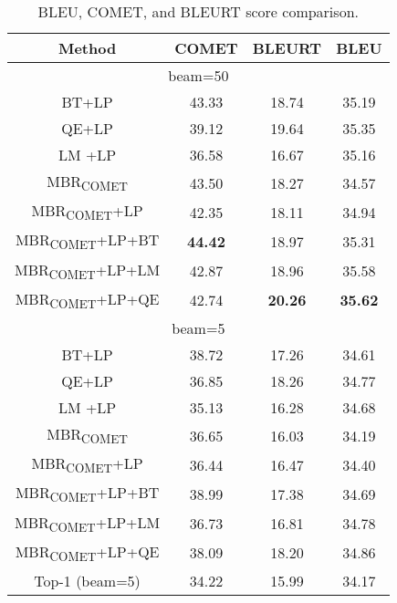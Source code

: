 \documentclass{article}
\begin{document}
\begin{table}[!htbp]
\centering
\begin{tabular}{cccc}
\toprule
Method         & COMET & BLEURT & BLEU  \\ \hline
\multicolumn{4}{c}{beam=50}                \\ \hline
BT+LP          & 43.33 & 18.74  & 35.19 \\
QE+LP          & 39.12 & 19.64  & 35.35 \\
LM +LP         & 36.58 & 16.67  & 35.16 \\
MBR\textsubscript{COMET}          & 43.50 & 18.27  & 34.57 \\
MBR\textsubscript{COMET}+LP       & 42.35 & 18.11  & 34.94 \\
MBR\textsubscript{COMET}+LP+BT    & \textbf{44.42} & 18.97  & 35.31 \\
MBR\textsubscript{COMET}+LP+LM    & 42.87 & 18.96  & 35.58 \\
MBR\textsubscript{COMET}+LP+QE    & 42.74 & \textbf{20.26}  & \textbf{35.62} \\ \hline
\multicolumn{4}{c}{beam=5}                 \\ \hline
BT+LP          & 38.72 & 17.26  & 34.61 \\
QE+LP          & 36.85 & 18.26  & 34.77 \\
LM +LP         & 35.13 & 16.28  & 34.68 \\
MBR\textsubscript{COMET}          & 36.65 & 16.03  & 34.19 \\
MBR\textsubscript{COMET}+LP       & 36.44 & 16.47  & 34.40 \\
MBR\textsubscript{COMET}+LP+BT    & 38.99 & 17.38  & 34.69 \\
MBR\textsubscript{COMET}+LP+LM    & 36.73 & 16.81  & 34.78 \\
MBR\textsubscript{COMET}+LP+QE    & 38.09 & 18.20  & 34.86 \\ \hline
Top-1 (beam=5) & 34.22 & 15.99  & 34.17 \\  \bottomrule
\end{tabular}
\caption{BLEU, COMET, and BLEURT score comparison.}
\label{table7}
\end{table}
 
\end{document}
